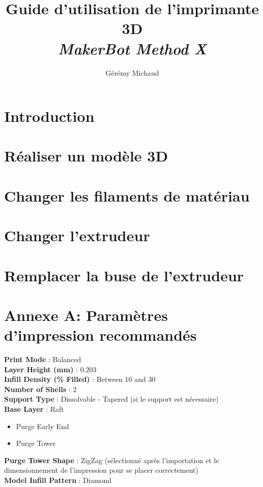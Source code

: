 \documentclass{Thesis}
\title{Guide d'utilisation de l'imprimante 3D
\\\Large{\textit{MakerBot Method X}}}
\author{Gérémy Michaud}{G. Michaud}
\begin{document}
\newpage
\tableofcontents
\clearpage
\section{Introduction}

\section{Réaliser un modèle 3D}

\section{Changer les filaments de matériau}

\section{Changer l'extrudeur}

\section{Remplacer la buse de l'extrudeur}

\newpage
\appendix
\section{Annexe A: Paramètres d'impression recommandés}
\label{annexe1}
\textbf{Print Mode} : Balanced \\
\textbf{Layer Height (mm)} : 0.203 \\
\textbf{Infill Density (\% Filled)} : Between 10 and 30 \\
\textbf{Number of Shells} : 2 \\
\textbf{Support Type} : Dissolvable - Tapered (si le support est nécessaire)\\
\textbf{Base Layer} : Raft
\newcommand{\cmark}{\ding{51}}
\newcommand{\done}{\rlap{$\square$}{\raisebox{2pt}{\large\hspace{1pt}\cmark}}}
\begin{itemize}
    \setlength\itemsep{1mm}
    \item[\done] Purge Early End
    \item[\done] Purge Tower
\end{itemize}
\textbf{Purge Tower Shape} : ZigZag (sélectionné après l'importation et le dimensionnement de l'impression pour se placer correctement) \\
\textbf{Model Infill Pattern} : Diamond
\end{document}
